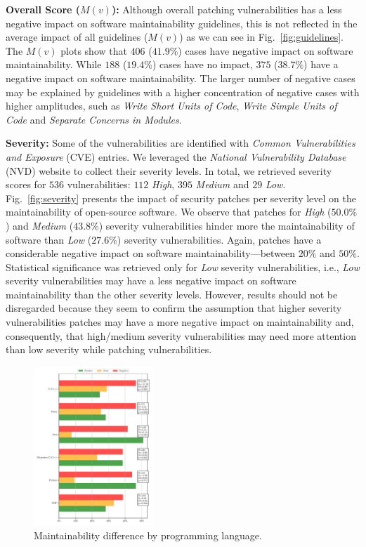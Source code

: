\documentclass[smallextended]{svjour3}       %
\begin{document}
\textbf{Overall Score ($M(v)$):} 
Although overall patching vulnerabilities has a less negative impact
on software maintainability guidelines, this is not reflected in the average 
impact of all guidelines ($M(v)$) as we can see in Fig.~\ref{fig:guidelines}.
The $M(v)$ plots show that $406$ ($41.9\%$) cases have negative impact
on software maintainability. While $188$ ($19.4\%$) cases have no impact, $375$ 
($38.7\%$) have a negative impact on software maintainability. The larger number of 
negative cases may be explained by guidelines with a higher concentration of negative 
cases with higher amplitudes, such as \emph{Write Short Units of Code}, \emph{Write 
Simple Units of Code} and \emph{Separate Concerns in Modules}.



\textbf{Severity:} Some of the vulnerabilities are identified with \emph{Common 
Vulnerabilities and Exposure} (CVE) entries. We leveraged the \emph{National 
Vulnerability Database} (NVD) website to collect their severity levels. In total, 
we retrieved severity scores for $536$ vulnerabilities: $112$ \emph{High}, 
$395$ \emph{Medium} and $29$ \emph{Low}. Fig.~\ref{fig:severity} 
presents the impact of security patches per severity level on the 
maintainability of open-source software. We observe that patches for 
\emph{High} ($50.0\%$) and \emph{Medium} ($43.8\%$) severity vulnerabilities 
hinder more the maintainability of software than \emph{Low} ($27.6\%$) 
severity vulnerabilities. Again, patches have a considerable 
negative impact on software maintainability---between $20\%$ 
and $50\%$. Statistical significance was retrieved only for \emph{Low}
severity vulnerabilities, i.e., \emph{Low} severity vulnerabilities
may have a less negative impact on software maintainability than the 
other severity levels. However, results should not be disregarded 
because they seem to confirm the 
assumption that higher severity vulnerabilities patches may have a 
more negative impact on maintainability and, consequently, that high/medium 
severity vulnerabilities may need more attention than low severity while 
patching vulnerabilities.


\begin{figure}[htp]
  \centering
  \includegraphics[width=0.4\textwidth]{figures/main_per_language.pdf}
  \caption{Maintainability difference by programming language.}
  \label{fig:lang_main}    
\end{figure}
\end{document}
